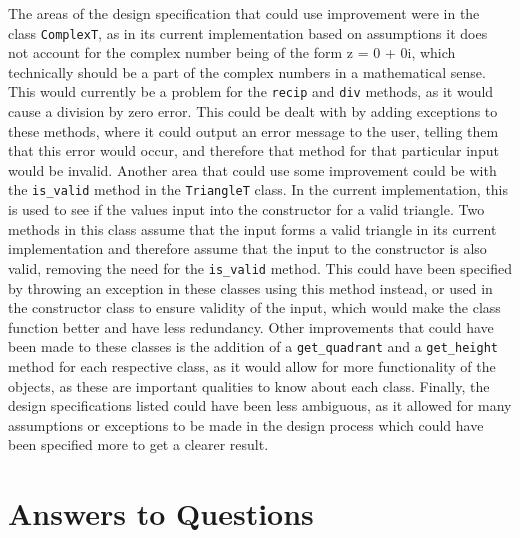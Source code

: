 \documentclass[12pt]{article}
\begin{document}
The areas of the design specification that could use improvement were in the class \verb|ComplexT|, as in its current implementation based on assumptions it does not account for the complex number being of the form z = 0 + 0i, which technically should be a part of the complex numbers in a mathematical sense. This would currently be a problem for the \verb|recip| and \verb|div| methods, as it would cause a division by zero error. This could be dealt with by adding exceptions to these methods, where it could output an error message to the user, telling them that this error would occur, and therefore that method for that particular input would be invalid. Another area that could use some improvement could be with the \verb|is_valid| method in the \verb|TriangleT| class. In the current implementation, this is used to see if the values input into the constructor for a valid triangle. Two methods in this class assume that the input forms a valid triangle in its current implementation and therefore assume that the input to the constructor is also valid, removing the need for the \verb|is_valid| method. This could have been specified by throwing an exception in these classes using this method instead, or used in the constructor class to ensure validity of the input, which would make the class function better and have less redundancy. Other improvements that could have been made to these classes is the addition of a \verb|get_quadrant| and a \verb|get_height| method for each respective class, as it would allow for more functionality of the objects, as these are important qualities to know about each class. Finally, the design specifications listed could have been less ambiguous, as it allowed for many assumptions or exceptions to be made in the design process which could have been specified more to get a clearer result. 

\section{Answers to Questions}
\end{document}
